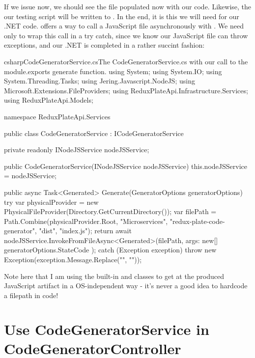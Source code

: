 \documentclass[paper=6in:9in,pagesize=pdftex,headinclude=on,footinclude=on,12pt,twoside]{scrbook}
\begin{document}
If we issue  now, we should see the  file populated now with our  code. Likewise, the our testing script will be written to . In the end, it is this  we will need for our .NET code.  offers a way to call a JavaScript file asynchronously with . We need only to wrap this call in a try catch, since we know our JavaScript file can throw exceptions, and our .NET  is completed in a rather succint fashion:

\begin{codeInput}{csharp}{CodeGeneratorService.cs}{The CodeGeneratorService.cs with our call to the module.exports generate function.}
using System;
using System.IO;
using System.Threading.Tasks;
using Jering.Javascript.NodeJS;
using Microsoft.Extensions.FileProviders;
using ReduxPlateApi.Infrastructure.Services;
using ReduxPlateApi.Models;

namespace ReduxPlateApi.Services
{
    public class CodeGeneratorService : ICodeGeneratorService
    {
        private readonly INodeJSService nodeJSService;

        public CodeGeneratorService(INodeJSService nodeJSService)
        {
            this.nodeJSService = nodeJSService;
        }

        public async Task<Generated> Generate(GeneratorOptions generatorOptions)
        {
            try
            {
                var physicalProvider = new PhysicalFileProvider(Directory.GetCurrentDirectory());
                var filePath = Path.Combine(physicalProvider.Root, "Microservices", "redux-plate-code-generator", "dist", "index.js");
                return await nodeJSService.InvokeFromFileAsync<Generated>(filePath, args: new[] { generatorOptions.StateCode });
            }
            catch (Exception exception)
            {
                throw new Exception(exception.Message.Replace("\n", ""));
            }
        }
    }
}  
\end{codeInput}

Note here that I am using the built-in  and  classes to get at the produced JavaScript artifact in a OS-independent way - it's never a good idea to hardcode a filepath in code!

\section{Use CodeGeneratorService in CodeGeneratorController}
\end{document}
